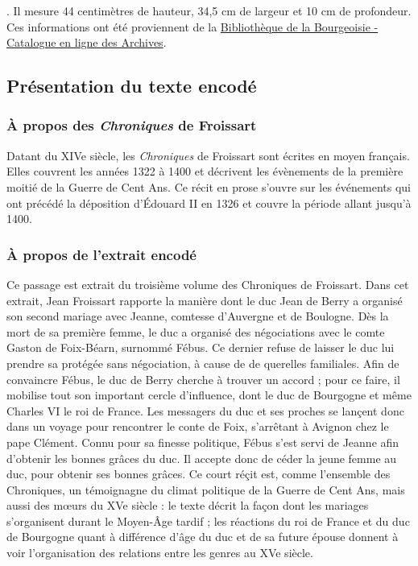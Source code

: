 \documentclass[12pt, a4paper]{article}
\begin{document}
                    . Il mesure 44 centimètres de hauteur, 34,5 cm de largeur et 10 cm de profondeur. Ces informations ont été proviennent de la \href{http://katalog.burgerbib.ch/detail.aspx?ID=147296}{Bibliothèque de la Bourgeoisie - Catalogue en ligne des Archives}.
                \subsection{Présentation du texte encodé}
                
        
        \subsubsection{À propos des \textit{Chroniques} de Froissart}
        Datant du XIVe siècle, les \textit{Chroniques} de Froissart sont écrites en moyen français. Elles couvrent les années 1322 à 1400 et décrivent les évènements de la première moitié de la Guerre de Cent Ans.
          Ce récit en prose s'ouvre sur les événements qui ont précédé la déposition d'Édouard II en 1326 et couvre la période allant jusqu'à 1400.\\ \indent 
        
        \subsubsection{À propos de l'extrait encodé}
        Ce passage est extrait du troisième volume des Chroniques de Froissart. Dans cet extrait, Jean Froissart rapporte la manière
                     dont le duc Jean de Berry a organisé son second mariage avec Jeanne, comtesse d’Auvergne et de Boulogne.
                     Dès la mort de sa première femme, le duc a organisé des négociations avec le comte Gaston de Foix-Béarn, surnommé Fébus. Ce dernier refuse de laisser
                     le duc lui prendre sa protégée sans négociation, à cause de de querelles familiales. Afin de convaincre Fébus, le duc de Berry cherche à trouver
                     un accord ; pour ce faire, il mobilise tout son important cercle d'influence, dont le duc de Bourgogne et même Charles VI le roi de France. Les messagers du duc et ses proches se lançent donc dans un voyage pour rencontrer le conte de Foix, s'arrêtant à Avignon chez le pape Clément. Connu pour
                     sa finesse politique, Fébus s'est servi de Jeanne
                     afin d'obtenir les bonnes grâces du duc. Il accepte donc de céder la jeune femme au duc, pour obtenir ses bonnes grâces. Ce court réçit est, comme l'ensemble des Chroniques, un témoignagne du climat politique de la Guerre de Cent Ans, mais aussi des mœurs du XVe siècle : le texte décrit 
                     la façon dont les mariages s'organisent durant le Moyen-Âge tardif ; les réactions du roi de France et du duc de Bourgogne quant à différence d'âge du duc et de sa future
                     épouse donnent à voir l'organisation des relations entre les genres au XVe siècle.
        
\end{document}
